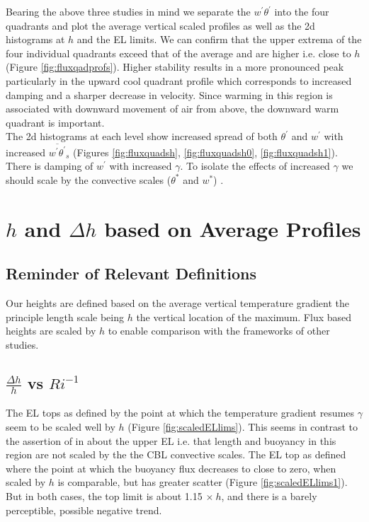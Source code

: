 Bearing the above three studies in mind we separate the $w^{'}\theta^{'}$ into the four quadrants and plot
the average vertical scaled profiles as well as the 2d histograms at $h$ and the \acs{EL} limits.  We
can confirm that the upper extrema of the four individual quadrants exceed that of the average
and are higher i.e. close to $h$ (Figure \ref{fig:fluxqadprofs}).  Higher stability results in a more pronounced peak particularly in the
upward cool quadrant profile which corresponds to increased damping and a sharper decrease in velocity.
Since warming in this region is associated with downward movement of air from above, the downward warm
quadrant is important.\\

The 2d histograms at each level show increased spread of both $\theta^{'}$ and $w^{'}$ with increased 
$\overline{w^{'}\theta^{'}}_{s}$ (Figures \ref{fig:fluxquadsh}, \ref{fig:fluxquadsh0}, \ref{fig:fluxquadsh1}).  There is damping of $w^{'}$ with increased $\gamma$.  To isolate the 
effects of increased $\gamma$ we should scale by the convective scales ($\theta^{*}$ and $w^{*}$) .


\section{$h$ and  $\Delta h$ based on Average Profiles}
\label{sec:hdeltahavprofs}
\subsection{Reminder of Relevant Definitions}
\FloatBarrier

Our heights are defined based on the average vertical temperature gradient the principle length scale being $h$ the vertical location of the maximum.  Flux based heights are scaled by $h$ to enable comparison with the frameworks of other studies.  

\subsection{$\frac{\Delta h}{h}$ vs $Ri^{-1}$}
\label{subsec:deltahri}
\FloatBarrier

The \acs{EL} tops as defined by the point at which the temperature gradient resumes $\gamma$ seem to be scaled well by $h$ (Figure \ref{fig:scaledELlims}).  This seems in contrast to the assertion of \citeauthor{GarciaMellado} in \cite{GarciaMellado} about the upper \acs{EL} i.e. that length and buoyancy in this region are not scaled by the the \acs{CBL} convective scales. The \acs{EL} top as defined where the point at which the buoyancy flux decreases to close to zero, when scaled by $h$ is comparable, but has greater scatter (Figure \ref{fig:scaledELlims1}). But in both cases, the top limit is about 1.15 $\times \ h$, and there is a barely perceptible, possible negative trend.\\  

